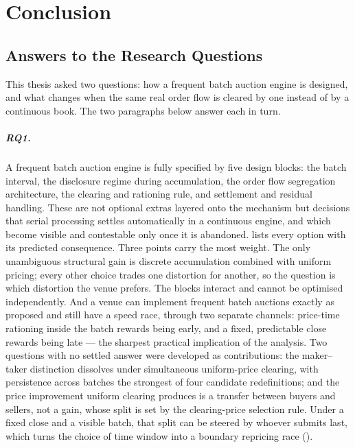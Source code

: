 \chapter{Conclusion}
\label{ch:conclusion}

\section{Answers to the Research Questions}

This thesis asked two questions: how a frequent batch auction engine is
designed, and what changes when the same real order flow is cleared by
one instead of by a continuous book. The two paragraphs below answer each
in turn.

\paragraph{RQ1.} A frequent batch auction engine is fully specified by five
design blocks: the batch interval, the disclosure regime during
accumulation, the order flow segregation architecture, the clearing and
rationing rule, and settlement and residual handling. These are not
optional extras layered onto the mechanism but decisions that serial
processing settles automatically in a continuous engine, and which become
visible and contestable only once it is abandoned. 
lists every option with its predicted consequence. Three points carry the
most weight. The only unambiguous structural gain is discrete accumulation
combined with uniform pricing; every other choice trades one distortion for
another, so the question is which distortion the venue prefers. The blocks
interact and cannot be optimised independently. And a venue can implement
frequent batch auctions exactly as proposed and still have a speed race,
through two separate channels: price-time rationing inside the batch
rewards being early, and a fixed, predictable close rewards being late ---
the sharpest practical implication of the analysis.
Two questions with no settled answer were developed as contributions: the
maker--taker distinction dissolves under simultaneous uniform-price
clearing, with persistence across batches the strongest of four candidate
redefinitions; and the price improvement uniform clearing produces is a
transfer between buyers and sellers, not a gain, whose split is set by the
clearing-price selection rule. Under a fixed close and a visible batch,
that split can be steered by whoever submits last, which turns the choice
of time window into a boundary repricing race ().

